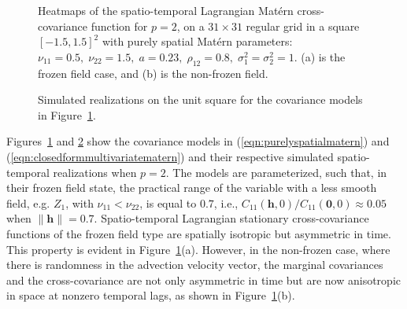 \documentclass[12pt]{article}
\newcommand{\0}{\mathbf{0}}
\begin{document}
\begin{figure}[!htbp]
 \centering
    \qquad
    \captionsetup[subfloat]{margin=-2cm}
     \caption{Heatmaps of the spatio-temporal Lagrangian Mat\'{e}rn cross-covariance function for $p=2$, on a $31\times 31$ regular grid in a square $[-1.5,1.5]^2$ with purely spatial Mat\'{e}rn parameters: $\nu_{11}=0.5,\;\nu_{22}=1.5,\;a=0.23,\;\rho_{12}=0.8,\;\sigma_1^2=\sigma_2^2=1$. (a) is the frozen field case, and (b) is the non-frozen field.}
   \label{fig:covariance_single_velocity}
   \end{figure}
   
   \begin{figure}[htb!]
 \centering
    \qquad
    \captionsetup[subfloat]{margin=-2cm}
     \caption{Simulated realizations on the unit square for the covariance models in Figure~\ref{fig:covariance_single_velocity}.}
   \label{fig:covariance_single_velocity_realizations}
   \end{figure}
   
Figures~\ref{fig:covariance_single_velocity} and \ref{fig:covariance_single_velocity_realizations} show the covariance models in (\ref{eqn:purelyspatialmatern}) and (\ref{eqn:closedformmultivariatematern}) and their respective simulated spatio-temporal realizations when $p=2$. The models are parameterized, such that, in their frozen field state, the practical range of the variable with a less smooth field, e.g. $Z_1$, with $\nu_{11}<\nu_{22}$, is equal to $0.7$, i.e., $C_{11}(\mathbf{h},0)/C_{11}(\mathbf{0},0)\approx 0.05$ when $\|\mathbf{h}\|=0.7$. Spatio-temporal Lagrangian stationary cross-covariance functions of the frozen field type are spatially isotropic but asymmetric in time. This property is evident in Figure~\ref{fig:covariance_single_velocity}(a). However, in the non-frozen case, where there is randomness in the advection velocity vector, the marginal covariances and the cross-covariance are not only asymmetric in time but are now anisotropic in space at nonzero temporal lags, as shown in Figure~\ref{fig:covariance_single_velocity}(b).
\end{document}
